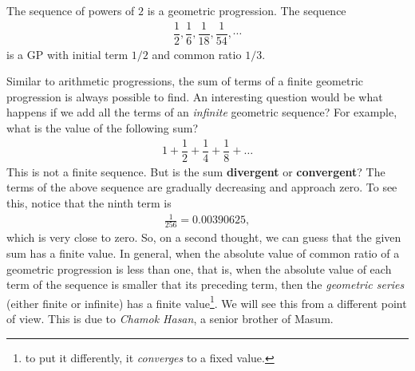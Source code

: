 \documentclass{subfile}
\begin{document}
	\begin{example}
		The sequence of powers of $2$ is a geometric progression. The sequence
			\begin{align*}
				\dfrac{1}{2}, \dfrac{1}{6}, \dfrac{1}{18}, \dfrac{1}{54}, \cdots
			\end{align*}
		is a GP with initial term $1/2$ and common ratio $1/3$.
	\end{example}
	
	Similar to arithmetic progressions, the sum of terms of a finite geometric progression is always possible to find. An interesting question would be what happens if we add all the terms of an \textit{infinite} geometric sequence? For example, what is the value of the following sum?
		\begin{align*}
			1 + \dfrac{1}{2}+ \dfrac{1}{4}+\dfrac{1}{8}+ \ldots
		\end{align*}
	This is not a finite sequence. But is the sum \textbf{divergent} or \textbf{convergent}? The terms of the above sequence are gradually decreasing and approach zero. To see this, notice that the ninth term is
		\begin{align*}
			\frac{1}{256} = 0.00390625,
		\end{align*}
	which is very close to zero. So, on a second thought, we can guess that the given sum has a finite value. In general, when the absolute value of common ratio of a geometric progression is less than one, that is, when the absolute value of each term of the sequence is smaller that its preceding term, then the \textit{geometric series} (either finite or infinite) has a finite value\footnote{to put it differently, it \textit{converges} to a fixed value.}. We will see this from a different point of view. This is due to \textit{Chamok Hasan}, a senior brother of Masum.
	
\end{document}
